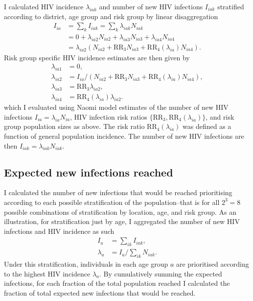 \documentclass[a4paper, nobind]{templates/ociamthesis}
\begin{document}
I calculated HIV incidence \(\lambda_{iak}\) and number of new HIV infections \(I_{iak}\) stratified according to district, age group and risk group by linear disaggregation
\begin{align}
    I_{ia} &= \sum_k I_{iak} = \sum_k \lambda_{iak}N_{iak} \\
    &= 0 + \lambda_{ia2} N_{ia2} + \lambda_{ia3} N_{ia3} + \lambda_{ia4} N_{ia4} \\
    &= \lambda_{ia2} \left(N_{ia2}  + \text{RR}_{3} N_{ia3} + \text{RR}_4(\lambda_{ia}) N_{ia4}  \right).
\end{align}
Risk group specific HIV incidence estimates are then given by
\begin{align}
    \lambda_{ia1} &= 0, \\
    \lambda_{ia2} &= I_{ia} / \left(N_{ia2} + \text{RR}_{3} N_{ia3} + \text{RR}_4(\lambda_{ia}) N_{ia4}\right), \\
    \lambda_{ia3} &= \text{RR}_{3} \lambda_{ia2}, \\
    \lambda_{ia4} &= \text{RR}_4(\lambda_{ia}) \lambda_{ia2}.
\end{align}
which I evaluated using Naomi model estimates of the number of new HIV infections \(I_{ia} = \lambda_{ia} N_{ia}\), HIV infection risk ratios \(\{\text{RR}_3, \text{RR}_4(\lambda_{ia})\}\), and risk group population sizes as above.
The risk ratio \(\text{RR}_4(\lambda_{ia})\) was defined as a function of general population incidence.
The number of new HIV infections are then \(I_{iak} = \lambda_{iak} N_{iak}\).

\hypertarget{expected-new-infections-reached}{%
\subsection{Expected new infections reached}\label{expected-new-infections-reached}}

I calculated the number of new infections that would be reached prioritising according to each possible stratification of the population--that is for all \(2^3 = 8\) possible combinations of stratification by location, age, and risk group.
As an illustration, for stratification just by age, I aggregated the number of new HIV infections and HIV incidence as such
\begin{align}
    I_a &= \sum_{ik} I_{iak}, \\
    \lambda_a &= I_a / \sum_{ik} N_{iak}.
\end{align}
Under this stratification, individuals in each age group \(a\) are prioritised according to the highest HIV incidence \(\lambda_a\).
By cumulatively summing the expected infections, for each fraction of the total population reached I calculated the fraction of total expected new infections that would be reached.
\end{document}
